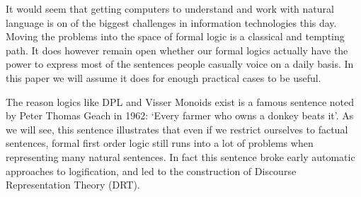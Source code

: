\documentclass[12pt]{article}
\begin{document}
It would seem that getting computers to understand and work with natural language is on of the biggest challenges in information technologies this day. Moving the problems into the space of formal logic is a classical and tempting path. It does however remain open whether our formal logics actually have the power to express most of the sentences people casually voice on a daily basis. In this paper we will assume it does for enough practical cases to be useful.

The reason logics like DPL and Visser Monoids exist is a famous sentence noted by Peter Thomas Geach in 1962\cite{geach1962reference}: `Every farmer who owns a donkey beats it'. As we will see, this sentence illustrates that even if we restrict ourselves to factual sentences, formal first order logic still runs into a lot of problems when representing many natural sentences. In fact this sentence broke early automatic approaches to logification, and led to the construction of Discourse Representation Theory (DRT)\cite{kamp1993discourse}.
\end{document}

